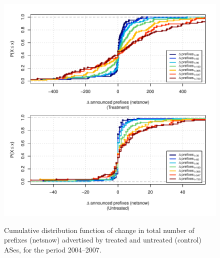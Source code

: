 \begin{figure}[H]
\begin{centering}
\begin{singlespace}
    \includegraphics[width=6in]{figures/behavior-netsnow-2004_2007-corr.pdf}
    \vspace{-2em}\\
    \caption{Cumulative distribution function of change in total number of prefixes (netsnow) advertised by treated and untreated (control) ASes, for the period 2004--2007.}
\end{singlespace}
\end{centering}
\end{figure}

